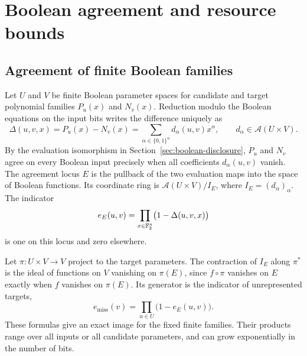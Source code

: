 \section{Boolean agreement and resource bounds}

\subsection{Agreement of finite Boolean families}
\label{sec:boolean-agreement}

Let \(U\) and \(V\) be finite Boolean parameter spaces for candidate and
target polynomial families \(P_u(x)\) and \(N_v(x)\). Reduction modulo
the Boolean equations on the input bits writes the difference uniquely as
\[
 \Delta(u,v,x)=P_u(x)-N_v(x)
   =\sum_{\alpha\in\{0,1\}^n} d_\alpha(u,v)x^\alpha ,
 \qquad d_\alpha\in\mathcal A(U\times V).
\]
By the evaluation isomorphism in Section~\ref{sec:boolean-disclosure},
\(P_u\) and \(N_v\) agree on every Boolean input precisely when all
coefficients \(d_\alpha(u,v)\) vanish. The agreement locus \(E\) is the
pullback of the two evaluation maps into the space of Boolean functions.
Its coordinate ring is \(\mathcal A(U\times V)/I_E\), where
\(I_E=(d_\alpha)_\alpha\). The indicator
\[
 e_E(u,v)=\prod_{x\in\mathbb F_2^n}\bigl(1-\Delta(u,v,x)\bigr)
\]
is one on this locus and zero elsewhere.

Let \(\pi\colon U\times V\to V\) project to the target parameters. The
contraction of \(I_E\) along \(\pi^*\) is the ideal of functions on \(V\)
vanishing on \(\pi(E)\), since \(f\circ\pi\) vanishes on \(E\) exactly
when \(f\) vanishes on \(\pi(E)\). Its generator is the indicator of
unrepresented targets,
\[
 e_{\mathrm{miss}}(v)=\prod_{u\in U}\bigl(1-e_E(u,v)\bigr).
\]
These formulas give an exact image for the fixed finite families.
Their products range over all inputs or all candidate parameters, and
can grow exponentially in the number of bits.

